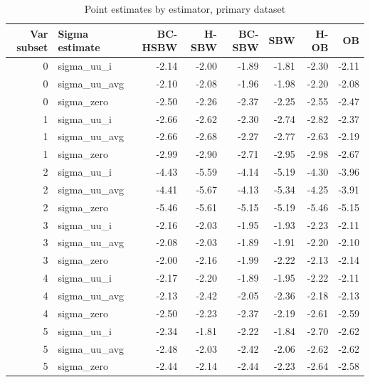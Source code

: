 \documentclass[12pt]{article}
\begin{document}
\begin{table}[ht]
\begin{tabular}{rlrrrrrr}
  \toprule
Var subset & Sigma estimate & BC-HSBW & H-SBW & BC-SBW & SBW & H-OB & OB \\ 
  \midrule
0 & sigma\_uu\_i & -2.14 & -2.00 & -1.89 & -1.81 & -2.30 & -2.11 \\ 
  0 & sigma\_uu\_avg & -2.10 & -2.08 & -1.96 & -1.98 & -2.20 & -2.08 \\ 
  0 & sigma\_zero & -2.50 & -2.26 & -2.37 & -2.25 & -2.55 & -2.47 \\ 
  1 & sigma\_uu\_i & -2.66 & -2.62 & -2.30 & -2.74 & -2.82 & -2.37 \\ 
  1 & sigma\_uu\_avg & -2.66 & -2.68 & -2.27 & -2.77 & -2.63 & -2.19 \\ 
  1 & sigma\_zero & -2.99 & -2.90 & -2.71 & -2.95 & -2.98 & -2.67 \\ 
  2 & sigma\_uu\_i & -4.43 & -5.59 & -4.14 & -5.19 & -4.30 & -3.96 \\ 
  2 & sigma\_uu\_avg & -4.41 & -5.67 & -4.13 & -5.34 & -4.25 & -3.91 \\ 
  2 & sigma\_zero & -5.46 & -5.61 & -5.15 & -5.19 & -5.46 & -5.15 \\ 
  3 & sigma\_uu\_i & -2.16 & -2.03 & -1.95 & -1.93 & -2.23 & -2.11 \\ 
  3 & sigma\_uu\_avg & -2.08 & -2.03 & -1.89 & -1.91 & -2.20 & -2.10 \\ 
  3 & sigma\_zero & -2.00 & -2.16 & -1.99 & -2.22 & -2.13 & -2.14 \\ 
  4 & sigma\_uu\_i & -2.17 & -2.20 & -1.89 & -1.95 & -2.22 & -2.11 \\ 
  4 & sigma\_uu\_avg & -2.13 & -2.42 & -2.05 & -2.36 & -2.18 & -2.13 \\ 
  4 & sigma\_zero & -2.50 & -2.23 & -2.37 & -2.19 & -2.61 & -2.59 \\ 
  5 & sigma\_uu\_i & -2.34 & -1.81 & -2.22 & -1.84 & -2.70 & -2.62 \\ 
  5 & sigma\_uu\_avg & -2.48 & -2.03 & -2.42 & -2.06 & -2.62 & -2.62 \\ 
  5 & sigma\_zero & -2.44 & -2.14 & -2.44 & -2.23 & -2.64 & -2.58 \\ 
   \bottomrule
\end{tabular}
\caption{Point estimates by estimator, primary dataset}
\label{tab:ptests}
\end{table}
\end{document}
